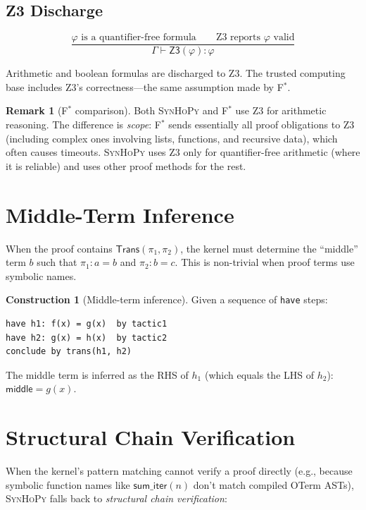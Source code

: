 \documentclass[11pt,a4paper]{report}
\theoremstyle{definition}
\newtheorem{remark}[definition]{Remark}
\newtheorem{construction}[definition]{Construction}
\theoremstyle{plain}
\newcommand{\Trans}{\mathsf{Trans}}
\newcommand{\fstar}{F$^{*}$}
\newcommand{\synhopy}{\textsc{SynHoPy}}
\begin{document}
\subsection{Z3 Discharge}

\[
  \frac{
    \varphi \text{ is a quantifier-free formula} \qquad
    \text{Z3 reports } \varphi \text{ valid}
  }{
    \Gamma \vdash \mathsf{Z3}(\varphi) : \varphi
  }
\]

Arithmetic and boolean formulas are discharged to Z3. The trusted computing base
includes Z3's correctness---the same assumption made by \fstar{}.

\begin{remark}[\fstar{} comparison]
Both \synhopy{} and \fstar{} use Z3 for arithmetic reasoning. The difference is
\emph{scope}: \fstar{} sends essentially all proof obligations to Z3 (including
complex ones involving lists, functions, and recursive data), which often causes
timeouts. \synhopy{} uses Z3 only for quantifier-free arithmetic (where it is
reliable) and uses other proof methods for the rest.
\end{remark}

\section{Middle-Term Inference}
\label{sec:middle-term}

When the proof contains $\Trans(\pi_1, \pi_2)$, the kernel must determine the
``middle'' term $b$ such that $\pi_1 : a = b$ and $\pi_2 : b = c$. This is
non-trivial when proof terms use symbolic names.

\begin{construction}[Middle-term inference]
Given a sequence of \texttt{have} steps:
\begin{lstlisting}[style=proof]
have h1: f(x) = g(x)  by tactic1
have h2: g(x) = h(x)  by tactic2
conclude by trans(h1, h2)
\end{lstlisting}
The middle term is inferred as the RHS of $h_1$ (which equals the LHS of $h_2$):
$\mathsf{middle} = g(x)$.
\end{construction}


\section{Structural Chain Verification}
\label{sec:structural-chain}

When the kernel's pattern matching cannot verify a proof directly (e.g., because
symbolic function names like $\mathsf{sum\_iter}(n)$ don't match compiled OTerm
ASTs), \synhopy{} falls back to \emph{structural chain verification}:
\end{document}
